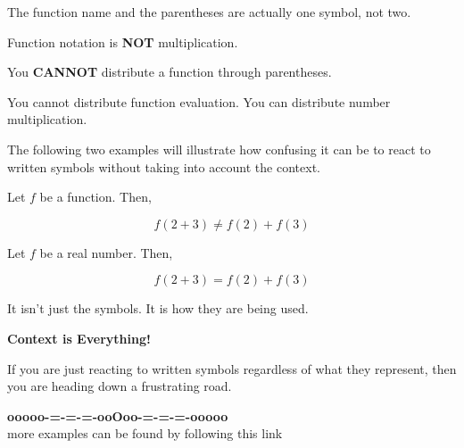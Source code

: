 \documentclass{ximera}
\begin{document}
The function name and the parentheses are actually one symbol, not two. 


\begin{warning}

Function notation is \textbf{\textcolor{red!70!black}{NOT}} multiplication. 

You \textbf{\textcolor{red!70!black}{CANNOT}} distribute a function through parentheses.


\end{warning}

You cannot distribute function evaluation. You can distribute number multiplication. 


The following two examples will illustrate how confusing it can be to react to written symbols without taking into account the context.  











\begin{example}


Let $f$ be a function.  Then, 


\[
f(2 + 3) \ne f(2) + f(3)
\]


\end{example}





\begin{example}


Let $f$ be a real number.  Then, 


\[
f(2 + 3) = f(2) + f(3)
\]


\end{example}


It isn't just the symbols.  It is how they are being used. 

\begin{center}
\textbf{\textcolor{red!70!black}{Context is Everything!}}
\end{center}

If you are just reacting to written symbols regardless of what they represent, then you are heading down a frustrating road.





\begin{onlineOnly}
\begin{center}
\textbf{\textcolor{green!50!black}{ooooo-=-=-=-ooOoo-=-=-=-ooooo}} \\

more examples can be found by following this link\\ 

\end{center}
\end{onlineOnly}
\end{document}
